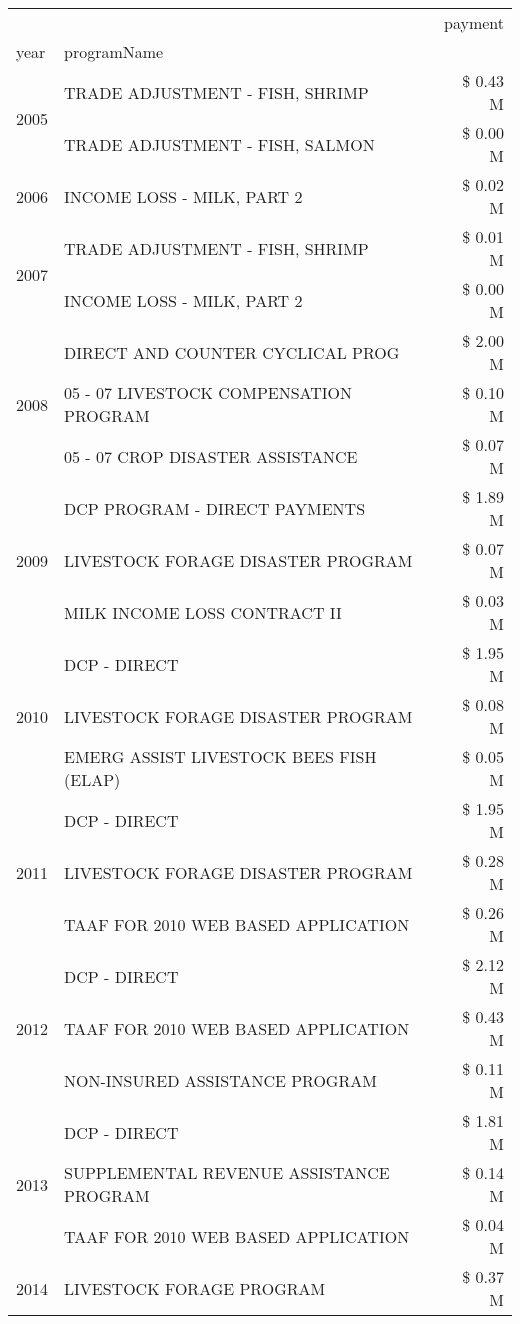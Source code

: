 \begin{tabular}{llr}
\toprule
 &  & payment \\
year & programName &  \\
\midrule
\multirow[t]{2}{*}{2005} & TRADE ADJUSTMENT - FISH, SHRIMP & \$ 0.43 M \\
 & TRADE ADJUSTMENT - FISH, SALMON & \$ 0.00 M \\
\cline{1-3}
2006 & INCOME LOSS - MILK, PART 2 & \$ 0.02 M \\
\cline{1-3}
\multirow[t]{2}{*}{2007} & TRADE ADJUSTMENT - FISH, SHRIMP & \$ 0.01 M \\
 & INCOME LOSS - MILK, PART 2 & \$ 0.00 M \\
\cline{1-3}
\multirow[t]{3}{*}{2008} & DIRECT AND COUNTER CYCLICAL PROG & \$ 2.00 M \\
 & 05 - 07 LIVESTOCK COMPENSATION PROGRAM & \$ 0.10 M \\
 & 05 - 07 CROP DISASTER ASSISTANCE & \$ 0.07 M \\
\cline{1-3}
\multirow[t]{3}{*}{2009} & DCP PROGRAM - DIRECT PAYMENTS & \$ 1.89 M \\
 & LIVESTOCK FORAGE DISASTER  PROGRAM & \$ 0.07 M \\
 & MILK INCOME LOSS CONTRACT II & \$ 0.03 M \\
\cline{1-3}
\multirow[t]{3}{*}{2010} & DCP - DIRECT & \$ 1.95 M \\
 & LIVESTOCK FORAGE DISASTER PROGRAM & \$ 0.08 M \\
 & EMERG ASSIST LIVESTOCK BEES FISH (ELAP) & \$ 0.05 M \\
\cline{1-3}
\multirow[t]{3}{*}{2011} & DCP - DIRECT & \$ 1.95 M \\
 & LIVESTOCK FORAGE DISASTER PROGRAM & \$ 0.28 M \\
 & TAAF FOR 2010 WEB BASED APPLICATION & \$ 0.26 M \\
\cline{1-3}
\multirow[t]{3}{*}{2012} & DCP - DIRECT & \$ 2.12 M \\
 & TAAF FOR 2010 WEB BASED APPLICATION & \$ 0.43 M \\
 & NON-INSURED ASSISTANCE PROGRAM & \$ 0.11 M \\
\cline{1-3}
\multirow[t]{3}{*}{2013} & DCP - DIRECT & \$ 1.81 M \\
 & SUPPLEMENTAL REVENUE ASSISTANCE PROGRAM & \$ 0.14 M \\
 & TAAF FOR 2010 WEB BASED APPLICATION & \$ 0.04 M \\
\cline{1-3}
\multirow[t]{3}{*}{2014} & LIVESTOCK FORAGE PROGRAM & \$ 0.37 M \\

\end{tabular}

